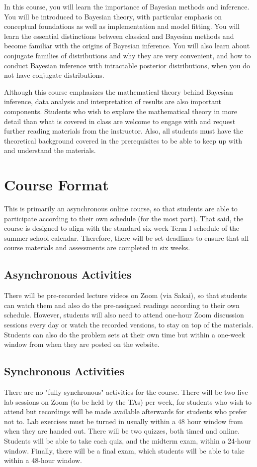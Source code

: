 \documentclass[11pt, a4paper]{article}
\begin{document}
In this course, you will learn the importance of Bayesian methods and inference. You will be introduced to Bayesian theory, with particular emphasis on conceptual foundations as well as implementation and model fitting. You will learn the essential distinctions between classical and Bayesian methods and become familiar with the origins of Bayesian inference. You will also learn about conjugate families of distributions and why they are very convenient, and how to conduct Bayesian inference with intractable posterior distributions,  when you do not have conjugate distributions.

Although this course emphasizes the mathematical theory behind Bayesian inference, data analysis and interpretation of results are also important components. Students who wish to explore the mathematical theory in more detail than what is covered in class are welcome to engage with and request further reading materials from the instructor. Also, all students must have the theoretical background covered in the prerequisites to be able to keep up with and understand the materials. 


\section{Course Format}
This is primarily an asynchronous online course, so that students are able to participate according to their own schedule (for the most part). That said, the course is designed to align with the standard six-week Term I schedule of the summer school calendar. Therefore, there will be set deadlines to ensure that all course materials and assessments are completed in six weeks.

\subsection{Asynchronous Activities}
There will be pre-recorded lecture videos on Zoom (via Sakai), so that students can watch them and also do the pre-assigned readings according to their own schedule.  However, students will also need to attend one-hour Zoom discussion sessions every day or watch the recorded versions, to stay on top of the materials.  Students can also do the problem sets at their own time but within a one-week window from when they are posted on the website.

\subsection{Synchronous Activities}
There are no "fully synchronous" activities for the course. There will be two live lab sessions on Zoom (to be held by the TAs) per week, for students who wish to attend but recordings will be made available afterwards for students who prefer not to. Lab exercises must be turned in usually within a 48 hour window from when they are handed out. There will be two quizzes, both timed and online. Students will be able to take each quiz, and the midterm exam, within a 24-hour window. Finally, there will be a final exam, which students will be able to take within a 48-hour window. 
\end{document}
